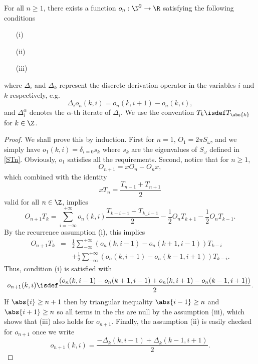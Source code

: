 \documentclass[a4paper]{article}
\begin{document}
	\begin{Lem}
		\label{lemPseudoDiffOn}
		For all $n \geq 1$, there exists a function $o_n : \N^2 \to \R$ satisfying the following conditions 
		\begin{itemize} \item[(i)]
			\item[(ii)]  
			\item[(iii)]
		\end{itemize}
		where $\Delta_i$ and $\Delta_k$ represent the discrete derivation operator in the variables $i$ and $k$ respectively, e.g. 
		\[ \Delta_i o_n(k,i) = o_n(k,i+1) - o_n(k,i),\]
		and $\Delta_i^\alpha$ denotes the $\alpha$-th iterate of $\Delta_i$. We use the convention $T_k \isdef T_{\abs{k}}$ for $k \in \Z$. 
	\end{Lem}
	\begin{proof}
		We shall prove this by induction. First for $n = 1$, $O_1 = 2\pi S_\omega$, and we simply have $o_1(k,i) = \delta_{i = 0} s_k$ where $s_k$ are the eigenvalues of $S_\omega$ defined in \autoref{STn}. Obviously, $o_1$ satisfies all the requirements. Second, notice that for $n \geq 1$, 
		\[O_{n+1} = x O_n - O_n x,\]
		which combined with the identity 
		\[x T_n = \dfrac{T_{n-1} + T_{n+1}}{2}\]
		valid for all $n \in \Z$, implies
		\[O_{n+1}T_k = \sum_{i= -\infty}^{+\infty} o_n(k,i) \dfrac{T_{k - i + 1} + T_{k _-i- 1}}{2} - \frac{1}{2} O_n T_{k+1} - \frac{1}{2} O_n T_{k - 1}.\]
		By the recurrence assumption (i), this implies 
		\begin{eqnarray*}
			O_{n+1}T_k &=& \frac{1}{2} \sum_{-\infty}^{+ \infty}\left(o_n(k,i-1) - o_n(k+1,i - 1)\right) T_{k - i} \\
			&&+ \frac{1}{2} \sum_{-\infty}^{+ \infty}\left(o_n(k,i+1) - o_n(k-1,i + 1)\right) T_{k - i}.
		\end{eqnarray*}
		Thus, condition (i) is satisfied with 
		\[o_{n+1}(k,i) \isdef \frac{\left(o_n(k,i-1) - o_n(k+1,i-1) + o_n(k,i+1) - o_n(k-1,i+1)\right)}{2}.\]
		If $\abs{i} \geq n+1$ then by triangular inequality $\abs{i-1} \geq n$ and $\abs{i+1} \geq n$ so all terms in the rhs are null by the assumption (iii), which shows that (iii) also holds for $o_{n+1}$. Finally, the assumption (ii) is easily checked for $o_{n+1}$ once we write 
		\[ o_{n+1}(k,i) = \frac{- \Delta_k(k,i-1) + \Delta_k(k-1,i+1)}{2}.\]
	\end{proof}
	
\end{document}
